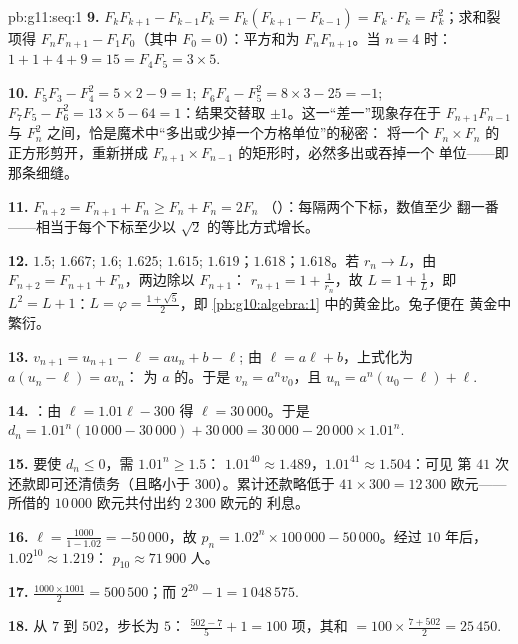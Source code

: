 \begin{solution}{pb:g11:seq:1}
\textbf{9.} $F_k F_{k+1} - F_{k-1} F_k = F_k (F_{k+1} -
F_{k-1}) = F_k \cdot F_k = F_k^2$；求和裂项得
$F_n F_{n+1} - F_1 F_0$（其中 $F_0 = 0$）：平方和为
$F_n F_{n+1}$。当 $n = 4$ 时：$1 + 1 + 4 + 9 = 15 = F_4 F_5 =
3 \times 5$.

\textbf{10.} $F_5 F_3 - F_4^2 = 5 \times 2 - 9 = 1$;
$F_6 F_4 - F_5^2 = 8 \times 3 - 25 = -1$;
$F_7 F_5 - F_6^2 = 13 \times 5 - 64 = 1$：结果交替取
$\pm 1$。这一“差一”现象存在于 $F_{n+1} F_{n-1}$ 与
$F_n^2$ 之间，恰是魔术中“多出或少掉一个方格单位”的秘密：
将一个 $F_n \times F_n$ 的正方形剪开，重新拼成
$F_{n+1} \times F_{n-1}$ 的矩形时，必然多出或吞掉一个
单位——即那条细缝。

\textbf{11.} $F_{n+2} = F_{n+1} + F_n \geq F_n + F_n = 2F_n$
（）：每隔两个下标，数值至少
翻一番——相当于每个下标至少以 $\sqrt2$
的等比方式增长。

\textbf{12.} $1.5$; $1.667$; $1.6$; $1.625$; $1.615$;
$1.619$；$1.618$；$1.618$。若 $r_n \to L$，由
$F_{n+2} = F_{n+1} + F_n$，两边除以 $F_{n+1}$：
$r_{n+1} = 1 + \frac{1}{r_n}$，故 $L = 1 + \frac1L$，即\
$L^2 = L + 1$：$L = \varphi = \frac{1 + \sqrt5}{2}$，即
\cref{pb:g10:algebra:1} 中的黄金比。兔子便在
黄金中繁衍。

\textbf{13.} $v_{n+1} = u_{n+1} - \ell = a u_n + b - \ell$;
由 $\ell = a\ell + b$，上式化为 $a(u_n - \ell) = a v_n$：
为 $a$ 的。于是 $v_n = a^n v_0$，且
$u_n = a^n (u_0 - \ell) + \ell$.

\textbf{14.} ：由 $\ell = 1.01\ell - 300$ 得
$\ell = 30\,000$。于是
$d_n = 1.01^n (10\,000 - 30\,000) + 30\,000
= 30\,000 - 20\,000 \times 1.01^n$.

\textbf{15.} 要使 $d_n \leq 0$，需 $1.01^n \geq 1.5$：
$1.01^{40} \approx 1.489$，$1.01^{41} \approx 1.504$：可见
第 $41$ 次还款即可还清债务（且略小于
$300$）。累计还款略低于 $41 \times 300 = 12\,300$
欧元——所借的 $10\,000$ 欧元共付出约 $2\,300$ 欧元的
利息。

\textbf{16.}  $\ell = \frac{1000}{1 - 1.02} =
-50\,000$，故 $p_n = 1.02^n \times 100\,000 - 50\,000$。经过
$10$ 年后，$1.02^{10} \approx 1.219$：
$p_{10} \approx 71\,900$ 人。

\textbf{17.} $\frac{1000 \times 1001}{2} = 500\,500$；而
$2^{20} - 1 = 1\,048\,575$.

\textbf{18.} 从 $7$ 到 $502$，步长为 $5$：
$\frac{502 - 7}{5} + 1 = 100$ 项，其和
$= 100 \times \frac{7 + 502}{2} = 25\,450$.


\end{solution}
